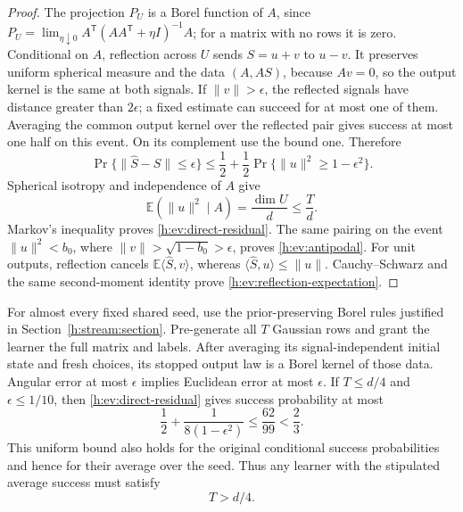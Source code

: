 \begin{proof}
The projection \(P_U\) is a Borel function of \(A\), since
\(P_U=\lim_{\eta\downarrow0}A^{\mathsf T}(AA^{\mathsf T}+\eta I)^{-1}A\);
for a matrix with no rows it is zero.
Conditional on \(A\), reflection across \(U\) sends \(S=u+v\) to
\(u-v\). It preserves uniform spherical measure and the data \((A,AS)\),
because \(Av=0\), so the output kernel is the same at both signals.
If \(\|v\|>\epsilon\), the reflected signals have distance greater
than \(2\epsilon\); a fixed estimate can succeed for at most one of
them. Averaging the common output kernel over the reflected pair gives
success at most one half on this event. On its complement use the
bound one. Therefore
\[
 \Pr\{\|\widehat S-S\|\le\epsilon\}
 \le\frac12+\frac12\Pr\{\|u\|^2\ge1-\epsilon^2\}.
\]
Spherical isotropy and independence of \(A\) give
\[
 \mathbb E(\|u\|^2\mid A)=\frac{\dim U}{d}\le\frac Td.
\]
Markov's inequality proves \eqref{h:ev:direct-residual}. The same
pairing on the event \(\|u\|^2<b_0\), where
\(\|v\|>\sqrt{1-b_0}>\epsilon\), proves
\eqref{h:ev:antipodal}. For unit outputs, reflection cancels
\(\mathbb E\langle\widehat S,v\rangle\), whereas
\(\langle\widehat S,u\rangle\le\|u\|\). Cauchy--Schwarz and the
same second-moment identity prove \eqref{h:ev:reflection-expectation}.
\end{proof}

For almost every fixed shared seed, use the prior-preserving Borel
rules justified in Section~\ref{h:stream:section}. Pre-generate all
\(T\) Gaussian rows and grant the learner the full matrix and labels.
After averaging its signal-independent initial state and fresh choices,
its stopped output law is a Borel kernel of those data. Angular error
at most \(\epsilon\) implies Euclidean error at most \(\epsilon\).
If \(T\le d/4\) and \(\epsilon\le1/10\), then
\eqref{h:ev:direct-residual} gives success probability at most
\[
 \frac12+\frac1{8(1-\epsilon^2)}
 \le\frac{62}{99}<\frac23.
\]
This uniform bound also holds for the original conditional success
probabilities and hence for their average over the seed. Thus any
learner with the stipulated average success must satisfy
\begin{equation}\label{h:end:linear-threshold}
 T>d/4.
\end{equation}


